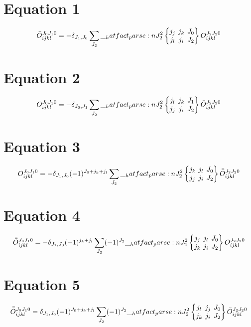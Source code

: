 \documentclass{scrartcl}
\newcommand{\sixj}[6]{\begingroup\setlength{\arraycolsep}{0.2em}\begin{Bmatrix} #1 & #2 & #3 \\ #4 & #5 & #6 \end{Bmatrix}\endgroup}
\begin{document}
\section{Equation 1}
\begin{dmath*}
\bar{O}_{i j k l}^{{J}_{0} {J}_{1} 0} = -\delta_{{J}_{1},{J}_{0}} \* \sum_{{J}_{2}} \* \hatfact{{J}_{2}^{2}} \* \sixj{{j}_{j}}{{j}_{k}}{{J}_{0}}{{j}_{l}}{{j}_{i}}{{J}_{2}} \* O_{i j k l}^{{J}_{2} {J}_{2} 0}
\end{dmath*}

\section{Equation 2}
\begin{dmath*}
O_{i j k l}^{{J}_{0} {J}_{1} 0} = -\delta_{{J}_{0},{J}_{1}} \* \sum_{{J}_{2}} \* \hatfact{{J}_{2}^{2}} \* \sixj{{j}_{l}}{{j}_{k}}{{J}_{1}}{{j}_{j}}{{j}_{i}}{{J}_{2}} \* \bar{O}_{i j k l}^{{J}_{2} {J}_{2} 0}
\end{dmath*}

\section{Equation 3}
\begin{dmath*}
O_{i j k l}^{{J}_{0} {J}_{1} 0} = -\delta_{{J}_{1},{J}_{0}} \* (-1)^{{J}_{0}+{j}_{k}+{j}_{l}} \* \sum_{{J}_{2}} \* \hatfact{{J}_{2}^{2}} \* \sixj{{j}_{k}}{{j}_{l}}{{J}_{0}}{{j}_{j}}{{j}_{i}}{{J}_{2}} \* \bar{\bar{O}}_{i j k l}^{{J}_{2} {J}_{2} 0}
\end{dmath*}

\section{Equation 4}
\begin{dmath*}
\bar{\bar{O}}_{i j k l}^{{J}_{0} {J}_{1} 0} = -\delta_{{J}_{1},{J}_{0}} \* (-1)^{{j}_{k}+{j}_{l}} \* \sum_{{J}_{2}} \* (-1)^{{J}_{2}} \* \hatfact{{J}_{2}^{2}} \* \sixj{{j}_{j}}{{j}_{l}}{{J}_{0}}{{j}_{k}}{{j}_{i}}{{J}_{2}} \* O_{i j k l}^{{J}_{2} {J}_{2} 0}
\end{dmath*}

\section{Equation 5}
\begin{dmath*}
\bar{\bar{O}}_{i j k l}^{{J}_{0} {J}_{1} 0} = \delta_{{J}_{1},{J}_{0}} \* (-1)^{{J}_{0}+{j}_{k}+{j}_{l}} \* \sum_{{J}_{2}} \* (-1)^{{J}_{2}} \* \hatfact{{J}_{2}^{2}} \* \sixj{{j}_{l}}{{j}_{j}}{{J}_{0}}{{j}_{k}}{{j}_{i}}{{J}_{2}} \* \bar{O}_{i j k l}^{{J}_{2} {J}_{2} 0}
\end{dmath*}
\end{document}
